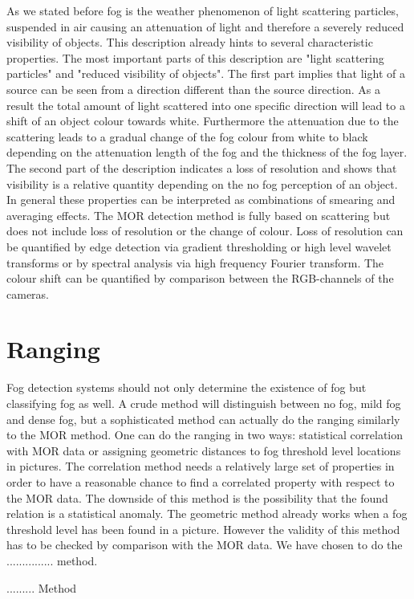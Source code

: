 \documentclass{article}
\begin{document}
As we stated before fog is the weather phenomenon of light scattering particles, suspended in air causing an attenuation of light and therefore a severely reduced visibility of objects. This description already hints to several characteristic properties. The most important parts of this description are "light scattering particles" and "reduced visibility of objects". The first part implies that light of a source can be seen from a direction different than the source direction. As a result the total amount of light scattered into one specific direction will lead to a shift of an object colour towards white. Furthermore the attenuation due to the scattering leads to a gradual change of the fog colour from white to black depending on the attenuation length of the fog and the thickness of the fog layer.
The second part of the description indicates a loss of resolution and shows that visibility is a relative quantity depending on the no fog perception of an object. In general these properties can be interpreted as combinations of smearing and averaging effects. 
The MOR detection method is fully based on scattering but does not include loss of resolution or the change of colour. Loss of resolution can be quantified by edge detection via gradient thresholding or high level wavelet transforms or by spectral analysis via high frequency Fourier transform. The colour shift can be quantified by comparison between the RGB-channels of the cameras.

\section{ Ranging}

Fog detection systems should not only determine the existence of fog but classifying fog as well. A crude method will distinguish between no fog, mild fog and dense fog, but a sophisticated method can actually do the ranging similarly to the MOR method. One can do the ranging in two ways: statistical correlation with MOR data or assigning geometric distances to fog threshold level locations in pictures. 
The correlation method needs a relatively large set of properties in order to have a reasonable chance  to find a correlated property with respect to the MOR data. The downside of this method is the possibility that the found relation is a statistical anomaly. 
The geometric method already works when a fog threshold level has been found in a picture. However the validity of this method has to be checked by comparison with the MOR data.
We have chosen to do the ............... method. 

......... Method
\end{document}

